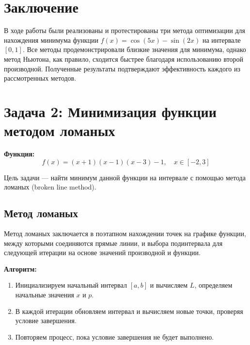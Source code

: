 \documentclass[a4paper,12pt]{article}
\begin{document}
\section{Заключение}

В ходе работы были реализованы и протестированы три метода оптимизации для нахождения минимума функции \( f(x) = \cos(5x) - \sin(2x) \) на интервале \([0, 1]\). Все методы продемонстрировали близкие значения для минимума, однако метод Ньютона, как правило, сходится быстрее благодаря использованию второй производной. Полученные результаты подтверждают эффективность каждого из рассмотренных методов.

\section{Задача 2: Минимизация функции методом ломаных}

\textbf{Функция:}
\[
f(x) = (x + 1)(x - 1)(x - 3) - 1, \quad x \in [-2, 3]
\]

Цель задачи — найти минимум данной функции на интервале с помощью метода ломаных (broken line method).

\subsection{Метод ломаных}

Метод ломаных заключается в поэтапном нахождении точек на графике функции, между которыми соединяются прямые линии, и выбора подинтервала для следующей итерации на основе значений производной и функции.

\textbf{Алгоритм:}
\begin{enumerate}
    \item Инициализируем начальный интервал \( [a, b] \) и вычисляем \( L \), определяем начальные значения \( x \) и \( p \).
    \item В каждой итерации обновляем интервал и вычисляем новые точки, проверяя условие завершения.
    \item Повторяем процесс, пока условие завершения не будет выполнено.
\end{enumerate}
\end{document}
